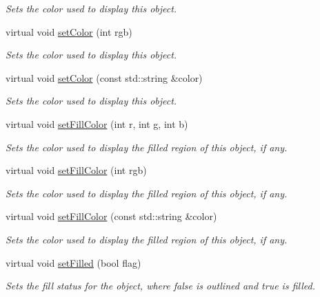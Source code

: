 \begin{DoxyCompactItemize}
\begin{DoxyCompactList}\small\item\em Sets the color used to display this object. \end{DoxyCompactList}\item 
virtual void \mbox{\hyperlink{classsgl_1_1GObject_ab1f5cc0f5cc6bbbd716a526c61f1081d}{set\+Color}} (int rgb)
\begin{DoxyCompactList}\small\item\em Sets the color used to display this object. \end{DoxyCompactList}\item 
virtual void \mbox{\hyperlink{classsgl_1_1GObject_a61374df6c11b52cfbb0815decdbaebc6}{set\+Color}} (const std\+::string \&color)
\begin{DoxyCompactList}\small\item\em Sets the color used to display this object. \end{DoxyCompactList}\item 
virtual void \mbox{\hyperlink{classsgl_1_1GObject_ad767a33971159e9493e221cca4c00ae9}{set\+Fill\+Color}} (int r, int g, int b)
\begin{DoxyCompactList}\small\item\em Sets the color used to display the filled region of this object, if any. \end{DoxyCompactList}\item 
virtual void \mbox{\hyperlink{classsgl_1_1GObject_aa59d9775a67fa7df2b24a95cd34840a3}{set\+Fill\+Color}} (int rgb)
\begin{DoxyCompactList}\small\item\em Sets the color used to display the filled region of this object, if any. \end{DoxyCompactList}\item 
virtual void \mbox{\hyperlink{classsgl_1_1GObject_adbc18b1a930aadd97d7437f9f7265b96}{set\+Fill\+Color}} (const std\+::string \&color)
\begin{DoxyCompactList}\small\item\em Sets the color used to display the filled region of this object, if any. \end{DoxyCompactList}\item 
virtual void \mbox{\hyperlink{classsgl_1_1GObject_a9b82b53362282c6bb7d6947068d2e55b}{set\+Filled}} (bool flag)
\begin{DoxyCompactList}\small\item\em Sets the fill status for the object, where {\ttfamily false} is outlined and {\ttfamily true} is filled. \end{DoxyCompactList}\item 

\end{DoxyCompactItemize}
